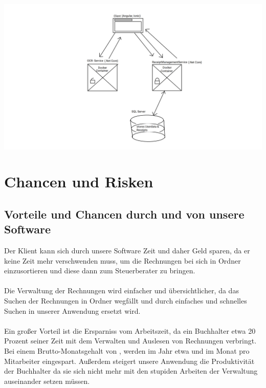 \documentclass[12pt]{article}
\theoremstyle{definition}
\begin{document}
\includegraphics[scale=0.35]{SystemConcept}
\pagebreak


\section{Chancen und Risken}

\subsection{Vorteile und Chancen durch und von unsere Software}

Der Klient kann sich durch unsere Software Zeit und daher Geld sparen, da er keine Zeit mehr verschwenden muss, um die Rechnungen bei sich in Ordner einzusortieren und diese dann zum Steuerberater zu bringen.\\ \\
Die Verwaltung der Rechnungen wird einfacher und übersichtlicher, da das Suchen der Rechnungen in Ordner wegfällt und durch einfaches und schnelles Suchen in unserer Anwendung ersetzt wird.\\ \\
Ein großer Vorteil ist die Ersparniss vom Arbeitszeit, da ein Buchhalter etwa 20 Prozent seiner Zeit mit dem Verwalten und Auslesen von Rechnungen verbringt. Bei einem Brutto-Monatsgehalt von , werden im Jahr etwa  und im Monat  pro Mitarbeiter eingespart. Außerdem steigert unsere Anwendung die Produktivität der Buchhalter da sie sich nicht mehr mit den stupiden Arbeiten der Verwaltung auseinander setzen müssen.\\
\end{document}
